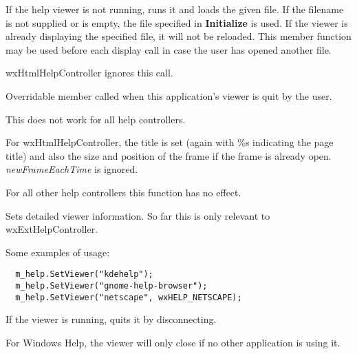 If the help viewer is not running, runs it and loads the given file.
If the filename is not supplied or is
empty, the file specified in {\bf Initialize} is used. If the viewer is
already displaying the specified file, it will not be reloaded. This
member function may be used before each display call in case the user
has opened another file.

wxHtmlHelpController ignores this call.

\label{wxhelpcontrolleronquit}


Overridable member called when this application's viewer is quit by the user.

This does not work for all help controllers.

\label{wxhelpcontrollersetframeparameters}


For wxHtmlHelpController, the title is set (again with \%s indicating the
page title) and also the size and position of the frame if the frame is already
open. {\it newFrameEachTime} is ignored.

For all other help controllers this function has no effect.

\label{wxhelpcontrollersetviewer}


Sets detailed viewer information. So far this is only relevant to wxExtHelpController.

Some examples of usage:

\begin{verbatim}
  m_help.SetViewer("kdehelp");
  m_help.SetViewer("gnome-help-browser");
  m_help.SetViewer("netscape", wxHELP_NETSCAPE);
\end{verbatim}

\label{wxhelpcontrollerquit}


If the viewer is running, quits it by disconnecting.

For Windows Help, the viewer will only close if no other application is using it.

